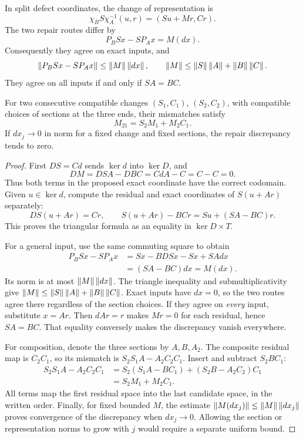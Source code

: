 \begin{KStheorem}\label{KS:KS66}
In split defect coordinates, the change of representation is
\begin{equation}\label{KS:eq:triangular-chart}
 \chi_BS\chi_A^{-1}(u,r)=(Su+Mr,Cr).
\end{equation}
The two repair routes differ by
\begin{equation}\label{KS:eq:repair-change}
 P_BSx-SP_Ax=M(dx).
\end{equation}
Consequently they agree on exact inputs, and
\[
 \left\lVert P_BSx-SP_Ax\right\rVert\le\left\lVert M\right\rVert\left\lVert dx\right\rVert,
 \qquad \left\lVert M\right\rVert\le\left\lVert S\right\rVert\left\lVert A\right\rVert+\left\lVert B\right\rVert\left\lVert C\right\rVert.
\]
They agree on all inputs if and only if \(SA=BC\).

For two consecutive compatible changes \((S_1,C_1)\), \((S_2,C_2)\), with compatible choices of sections at the three ends, their mismatches satisfy
\[
 M_{21}=S_2M_1+M_2C_1.
\]
If \(dx_j\to0\) in norm for a fixed change and fixed sections, the repair discrepancy tends to zero.
\end{KStheorem}
\begin{proof}
First \(DS=Cd\) sends \(\ker d\) into \(\ker D\), and
\[
 DM=DSA-DBC=CdA-C=C-C=0.
\]
Thus both terms in the proposed exact coordinate have the correct codomain. Given \(u\in\ker d\), compute the residual and exact coordinates of \(S(u+Ar)\) separately:
\[
 DS(u+Ar)=Cr,\qquad
 S(u+Ar)-BCr=Su+(SA-BC)r.
\]
This proves the triangular formula as an equality in \(\ker D\times T\).

For a general input, use the same commuting square to obtain
\[
 \begin{aligned}
 P_BSx-SP_Ax
 &=Sx-BDSx-Sx+SAdx\\
 &=(SA-BC)dx=M(dx).
 \end{aligned}
\]
Its norm is at most \(\left\lVert M\right\rVert\left\lVert dx\right\rVert\). The triangle inequality and submultiplicativity give \(\left\lVert M\right\rVert\le\left\lVert S\right\rVert\left\lVert A\right\rVert+\left\lVert B\right\rVert\left\lVert C\right\rVert\). Exact inputs have \(dx=0\), so the two routes agree there regardless of the section choices. If they agree on \emph{every} input, substitute \(x=Ar\). Then \(dAr=r\) makes \(Mr=0\) for each residual, hence \(SA=BC\). That equality conversely makes the discrepancy vanish everywhere.

For composition, denote the three sections by \(A,B,A_2\). The composite residual map is \(C_2C_1\), so its mismatch is \(S_2S_1A-A_2C_2C_1\). Insert and subtract \(S_2BC_1\):
\[
 \begin{aligned}
 S_2S_1A-A_2C_2C_1
 &=S_2(S_1A-BC_1)+(S_2B-A_2C_2)C_1\\
 &=S_2M_1+M_2C_1.
 \end{aligned}
\]
All terms map the first residual space into the last candidate space, in the written order. Finally, for fixed bounded \(M\), the estimate \(\left\lVert M(dx_j)\right\rVert\le\left\lVert M\right\rVert\left\lVert dx_j\right\rVert\) proves convergence of the discrepancy when \(dx_j\to0\). Allowing the section or representation norms to grow with \(j\) would require a separate uniform bound.
\end{proof}
